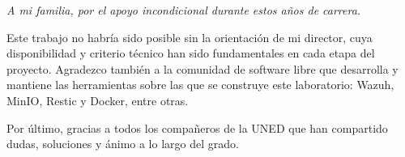 \documentclass[../main.tex]{subfiles}
\begin{document}
\begin{flushright}
\textit{A mi familia, por el apoyo incondicional durante estos años de carrera.}
\end{flushright}

\bigskip

Este trabajo no habría sido posible sin la orientación de mi director, cuya
disponibilidad y criterio técnico han sido fundamentales en cada etapa del
proyecto. Agradezco también a la comunidad de software libre que desarrolla
y mantiene las herramientas sobre las que se construye este laboratorio:
Wazuh, MinIO, Restic y Docker, entre otras.

Por último, gracias a todos los compañeros de la UNED que han compartido
dudas, soluciones y ánimo a lo largo del grado.
\end{document}
